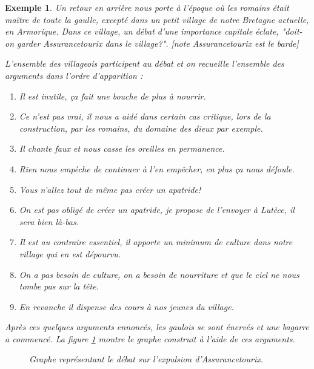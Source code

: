 \documentclass[11pt]{article}
\theoremstyle{defi}
\theoremstyle{not}
\theoremstyle{prob}
\newtheorem{example}{Exemple}[section]
\begin{document}
    \begin{example}
      Un retour en arrière nous porte à l'époque où les romains était maître de toute la gaulle, excepté dans un petit village de notre Bretagne actuelle, en Armorique.
      Dans ce village, un débat d'une importance capitale éclate, "doit-on garder Assurancetourix dans le village?". [note Assurancetourix est le barde]

      L'ensemble des villageois participent au débat et on recueille l'ensemble des arguments dans l'ordre d'apparition :
      \begin{enumerate}[label=$a_\arabic*$.]
        \item Il est inutile, ça fait une bouche de plus à nourrir.
        \item Ce n'est pas vrai, il nous a aidé dans certain cas critique, lors de la construction, par les romains, du domaine des dieux par exemple.
        \item Il chante faux et nous casse les oreilles en permanence.
        \item Rien nous empèche de continuer à l'en empêcher, en plus ça nous défoule.
        \item Vous n'allez tout de même pas créer un apatride!
        \item On est pas obligé de créer un apatride, je propose de l'envoyer à Lutèce, il sera bien là-bas.
        \item Il est au contraire essentiel, il apporte un minimum de culture dans notre village qui en est dépourvu.
        \item On a pas besoin de culture, on a besoin de nourriture et que le ciel ne nous tombe pas sur la tête.
        \item En revanche il dispense des cours à nos jeunes du village.
      \end{enumerate}
      Après ces quelques arguments ennoncés, les gaulois se sont énervés et une bagarre a commencé. La figure \ref{fig:asterix} montre le graphe construit à l'aide de ces arguments.

      \begin{figure}
      \centering
      \caption{Graphe représentant le débat sur l'expulsion d'Assurancetourix.}
      \label{fig:asterix}
      \end{figure}


\end{example}
\end{document}
